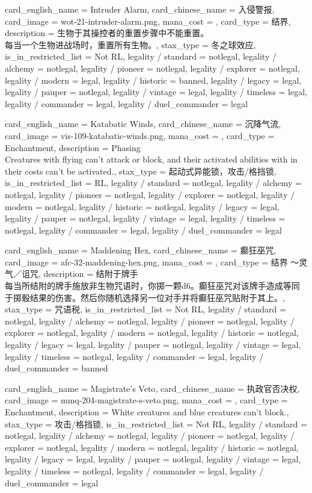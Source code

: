 \documentclass[lang = cn, color = black, 10pt]{AllThatStax}
\begin{document}
\card
{
	card_english_name = {Intruder Alarm},
	card_chinese_name = {入侵警报},
	card_image = wot-21-intruder-alarm.png,
	mana_cost = ,
	card_type = 结界,
	description = {生物于其操控者的重置步骤中不能重置。\\
		每当一个生物进战场时，重置所有生物。},
	stax_type = 冬之球效应,
	is_in_restricted_list = Not RL,
	legality / standard = notlegal,
	legality / alchemy = notlegal,
	legality / pioneer = notlegal,
	legality / explorer = notlegal,
	legality / modern = legal,
	legality / historic = banned,
	legality / legacy = legal,
	legality / pauper = notlegal,
	legality / vintage = legal,
	legality / timeless = legal,
	legality / commander = legal,
	legality / duel_commander = legal
}

\card
{
	card_english_name = {Katabatic Winds},
	card_chinese_name = {沉降气流},
	card_image = vis-109-katabatic-winds.png,
	mana_cost = ,
	card_type = Enchantment,
	description = {Phasing \\
		Creatures with flying can't attack or block, and their activated abilities with  in their costs can't be activated.},
	stax_type = 起动式异能锁，攻击/格挡锁,
	is_in_restricted_list = RL,
	legality / standard = notlegal,
	legality / alchemy = notlegal,
	legality / pioneer = notlegal,
	legality / explorer = notlegal,
	legality / modern = notlegal,
	legality / historic = notlegal,
	legality / legacy = legal,
	legality / pauper = notlegal,
	legality / vintage = legal,
	legality / timeless = notlegal,
	legality / commander = legal,
	legality / duel_commander = legal
}

\card
{
	card_english_name = {Maddening Hex},
	card_chinese_name = {癫狂巫咒},
	card_image = afc-32-maddening-hex.png,
	mana_cost = ,
	card_type = 结界 ～灵气／诅咒,
	description = {结附于牌手\\
		每当所结附的牌手施放非生物咒语时，你掷一颗d6。癫狂巫咒对该牌手造成等同于掷骰结果的伤害。然后你随机选择另一位对手并将癫狂巫咒贴附于其上。},
	stax_type = 咒语税,
	is_in_restricted_list = Not RL,
	legality / standard = notlegal,
	legality / alchemy = notlegal,
	legality / pioneer = notlegal,
	legality / explorer = notlegal,
	legality / modern = notlegal,
	legality / historic = notlegal,
	legality / legacy = legal,
	legality / pauper = notlegal,
	legality / vintage = legal,
	legality / timeless = notlegal,
	legality / commander = legal,
	legality / duel_commander = banned
}

\card
{
	card_english_name = {Magistrate's Veto},
	card_chinese_name = {执政官否决权},
	card_image = mmq-204-magistrate-s-veto.png,
	mana_cost = ,
	card_type = Enchantment,
	description = {White creatures and blue creatures can't block.},
	stax_type = 攻击/格挡锁,
	is_in_restricted_list = Not RL,
	legality / standard = notlegal,
	legality / alchemy = notlegal,
	legality / pioneer = notlegal,
	legality / explorer = notlegal,
	legality / modern = notlegal,
	legality / historic = notlegal,
	legality / legacy = legal,
	legality / pauper = notlegal,
	legality / vintage = legal,
	legality / timeless = notlegal,
	legality / commander = legal,
	legality / duel_commander = legal
}
\end{document}
